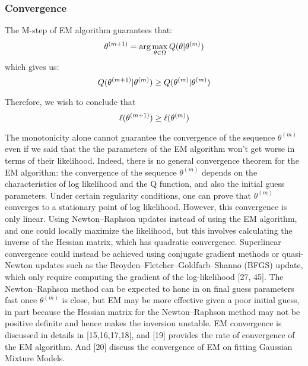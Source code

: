 \documentclass[onecolumn,12pt]{IEEEtran}
\begin{document}
\subsubsection{Convergence}
The M-step of EM algorithm guarantees that:
\begin{equation}
  \theta^{(m+1)} = \arg\max_{\theta\in \Omega}Q(\theta|\theta^{(m)}) \\
\end{equation}
which gives us:
\begin{equation}
  Q(\theta^{(m+1)}|\theta^{(m)}) \geq Q(\theta^{(m)}|\theta^{(m)}) \\
\end{equation}

Therefore, we wish to conclude that 
\begin{equation}
  \ell(\theta^{(m+1)}) \geq \ell(\theta^{(m)}) \\
\end{equation}

The monotonicity alone cannot guarantee the convergence of the sequence ${\theta^{(m)}}$ even if we said that the the parameters of the EM algorithm won’t get worse in terms of their likelihood. Indeed, there is no general convergence theorem for the EM algorithm: the convergence of the sequence ${\theta^{(m)}}$ depends on the characteristics of log likelihood and the Q function, and also the initial guess parameters. Under certain regularity conditions, one can prove that ${\theta^{(m)}}$ converges to a stationary point of log likelihood. However, this convergence is only linear. Using Newton–Raphson updates instead of using the EM algorithm, and one could locally maximize the likelihood, but this involves calculating the inverse of the Hessian matrix, which has quadratic convergence. Superlinear convergence could instead be achieved using conjugate gradient methods or quasi-Newton updates such as the Broyden–Fletcher–Goldfarb–Shanno (BFGS) update, which only require computing the gradient of the log-likelihood [27, 45]. The Newton–Raphson method can be expected to hone in on final guess parameters fast once $\theta^{(m)}$ is close, but EM may be more effective given a poor initial guess, in part because the Hessian matrix for the Newton–Raphson method may not be positive definite and hence makes the inversion unstable.
EM convergence is discussed in details in [15,16,17,18], and [19] provides the rate of convergence of the EM algorithm. And [20] discuss the convergence of EM on fitting Gaussian Mixture Models.
\end{document}
